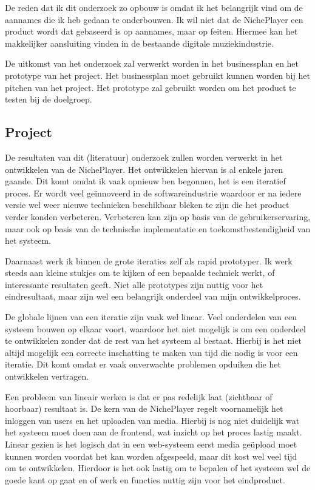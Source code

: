 De reden dat ik dit onderzoek zo opbouw is omdat ik het belangrijk vind om de aannames die ik heb gedaan te onderbouwen. Ik wil niet dat de NichePlayer een product wordt dat gebaseerd is op aannames, maar op feiten. Hiermee kan het makkelijker aansluiting vinden in de bestaande digitale muziekindustrie.


De uitkomst van het onderzoek zal verwerkt worden in het businessplan en het prototype van het project. Het businessplan moet gebruikt kunnen worden bij het pitchen van het project. Het prototype zal gebruikt worden om het product te testen bij de doelgroep.

\subsection{Project}
De resultaten van dit (literatuur) onderzoek zullen worden verwerkt in het ontwikkelen van de NichePlayer. Het ontwikkelen hiervan is al enkele jaren gaande. Dit komt omdat ik vaak opnieuw ben begonnen, het is een iteratief proces. Er wordt veel geïnnoveerd in de softwareindustrie waardoor er na iedere versie wel weer nieuwe technieken beschikbaar bleken te zijn die het product verder konden verbeteren. Verbeteren kan zijn op basis van de gebruikerservaring, maar ook op basis van de technische implementatie en toekomstbestendigheid van het systeem.

Daarnaast werk ik binnen de grote iteraties zelf als rapid prototyper. Ik werk steeds aan kleine stukjes om te kijken of een bepaalde techniek werkt, of interessante resultaten geeft. Niet alle prototypes zijn nuttig voor het eindresultaat, maar zijn wel een belangrijk onderdeel van mijn ontwikkelproces.

De globale lijnen van een iteratie zijn vaak wel linear. Veel onderdelen van een systeem bouwen op elkaar voort, waardoor het niet mogelijk is om een onderdeel te ontwikkelen zonder dat de rest van het systeem al bestaat. Hierbij is het niet altijd mogelijk een correcte inschatting te maken van tijd die nodig is voor een iteratie. Dit komt omdat er vaak onverwachte problemen opduiken die het ontwikkelen vertragen.

Een probleem van lineair werken is dat er pas redelijk laat (zichtbaar of hoorbaar) resultaat is. De kern van de NichePlayer regelt voornamelijk het inloggen van users en het uploaden van media. Hierbij is nog niet duidelijk wat het systeem moet doen aan de frontend, wat inzicht op het proces lastig maakt. Linear gezien is het logisch dat in een web-systeem eerst media geüpload moet kunnen worden voordat het kan worden afgespeeld, maar dit kost wel veel tijd om te ontwikkelen. Hierdoor is het ook lastig om te bepalen of het systeem wel de goede kant op gaat en of werk en functies nuttig zijn voor het eindproduct.

